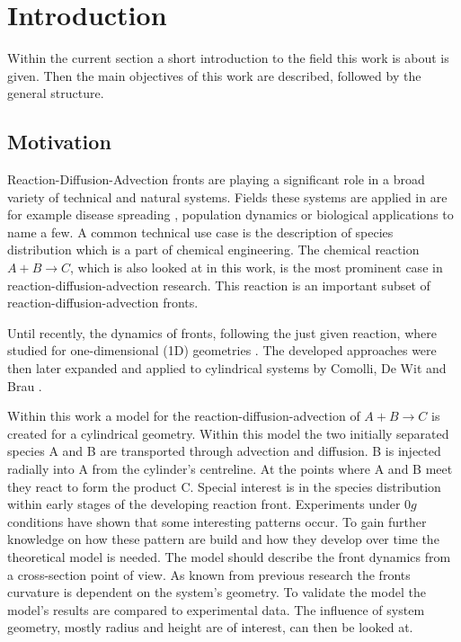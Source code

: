 \documentclass[../thesis.tex]{subfiles}
\begin{document}
\chapter{Introduction}
\label{chp:introduction}

Within the current section a short introduction to the field this work is about is given. Then the main objectives of this work are described, followed by the general structure. 

\section{Motivation}

Reaction-Diffusion-Advection fronts are playing a significant role in a broad variety of technical and natural systems. Fields these systems are applied in are  for example disease spreading \cite{kuto2017concentration}, population dynamics \cite{chen2018hopf, wang2019persistence} or biological applications \cite{zhao2011operator} to name a few. A common technical use case is the description of species distribution \cite{nakagaki1999reaction, von2013measurement} which is a part of chemical engineering. The chemical reaction $ A+B \rightarrow C$, which is also looked at in this work, is the most prominent case in reaction-diffusion-advection research. This reaction is an important subset of reaction-diffusion-advection fronts.

Until recently, the dynamics of fronts, following the just given reaction, where studied for one-dimensional (1D) geometries \cite{PhysRevA.38.3151}. The developed approaches were then later expanded and applied to cylindrical systems by Comolli, De Wit and Brau \cite{comolli2021dynamics}.

Within this work a model for the reaction-diffusion-advection of $ A+B \rightarrow C$ is created for a cylindrical geometry. Within this model the two initially separated species A and B are transported through advection and diffusion. B is injected radially into A from the cylinder's centreline. At the points where A and B meet they react to form the product C. Special interest is in the species distribution within early stages of the developing reaction front. Experiments under $ 0g$ conditions have shown that some interesting patterns occur. To gain further knowledge on how these pattern are build and how they develop over time the theoretical model is needed. The model should describe the front dynamics from a cross-section point of view. As known from previous research the fronts curvature is dependent on the system's geometry. To validate the model the model's results are compared to experimental data. The influence of system geometry, mostly radius and height are of interest, can then be looked at. 
\end{document}
